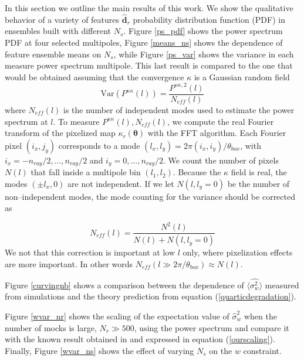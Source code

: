 \documentclass[reprint,aps,prd,superscriptaddress,showkeys,showpacs]{revtex4-1}
\newcommand{\bbh}[1]{\mathbf{\hat{#1}}}
\newcommand{\h}[1]{\hat{#1}}
\begin{document}

In this section we outline the main results of this work. We show the qualitative behavior of a variety of features $\bbh{d}_r$ probability distribution function (PDF) in ensembles built with different $N_s$. Figure \ref{ps_pdf} shows the power spectrum PDF at four selected multipoles, Figure \ref{means_ns} shows the dependence of feature ensemble means on $N_s$, while Figure \ref{ps_var} shows the variance in each measure power spectrum multipole. This last result is compared to the one that would be obtained assuming that the convergence $\kappa$ is a Gaussian random field
\begin{equation}
\label{gaussianvar}
\mathrm{Var}(P^{\kappa\kappa}(l)) = \frac{P^{\kappa\kappa,2}(l)}{N_{eff}(l)}
\end{equation}
%
where $N_{eff}(l)$ is the number of independent modes used to estimate the power spectrum at $l$. To measure $P^{\kappa\kappa}(l),N_{eff}(l)$, we compute the real Fourier transform of the pixelized map $\kappa_r(\pmb{\theta})$ with the FFT algorithm. Each Fourier pixel $(i_x,j_y)$ corresponds to a mode $(l_x,l_y)=2\pi(i_x,i_y)/\theta_{box}$, with $i_x=-n_{ray}/2,...,n_{ray}/2$ and $i_y=0,...,n_{ray}/2$. We count the number of pixels $N(l)$ that fall inside a multipole bin $(l_1,l_2)$. Because the $\kappa$ field is real, the modes $(\pm l_x,0)$ are not independent. If we let $N(l,l_y=0)$ be the number of non--independent modes, the mode counting for the variance should be corrected as 

\begin{equation}
N_{eff}(l) = \frac{N^2(l)}{N(l)+N(l,l_y=0)}
\end{equation}
%
We not that this correction is important at low $l$ only, where pixelization effects are more important. In other words $N_{eff}(l\gg2\pi/\theta_{box})\approx N(l)$. 

Figure \ref{curvingnb} shows a comparison between the dependence of $\langle\h{\sigma^2_w}\rangle$ measured from simulations and the theory prediction from equation (\ref{quarticdegradation}). 

Figure \ref{wvar_nr} shows the scaling of the expectation value of $\h{\sigma}_w^2$ when the number of mocks is large, $N_r\gg500$, using the power spectrum and compare it with the known result obtained in \citep{DodelsonSchneider13} and expressed in equation (\ref{ourscaling}). Finally, Figure \ref{wvar_ns} shows the effect of varying $N_s$ on the $w$ constraint.  
\end{document}
